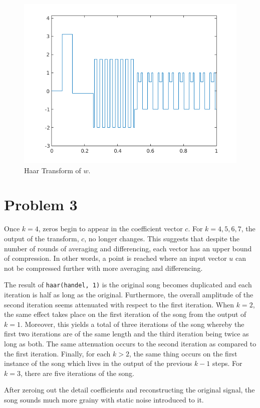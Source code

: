 \documentclass[paper=a4, fontsize=11pt]{scrartcl} %
\begin{document}
\begin{figure}[ht]
      \begin{minipage}[b]{0.5\linewidth}
          \centering
          \includegraphics[width=.5\linewidth]{haar_cat.png} 
          \caption{Haar Transform of $w$.} 
          \vspace{4ex}
      \end{minipage} 
  \end{figure}

\section*{Problem 3}

Once $k=4$, zeros begin to appear in the coefficient vector $c$.  For $k=4, 5,
6, 7$, the output of the transform, $c$, no longer changes. This suggests that
despite the number of rounds of averaging and differencing, each vector has an
upper bound of compression. In other words, a point is reached where an input
vector $u$ can not be compressed further with more averaging and differencing. 

\bigskip
The result of \texttt{haar(handel, 1)} is the original song becomes duplicated and
each iteration is half as long as the original.  Furthermore, the overall
amplitude of the second iteration seems attenuated with respect to the first
iteration. When $k=2$, the same effect takes place on the first iteration of
the song from the output of $k=1$. Moreover, this yields a total of three
iterations of the song whereby the first two iterations are of the same length
and the third iteration being twice as long as both. The same attenuation
occurs to the second iteration as compared to the first iteration.  Finally,
for each $k>2$, the same thing occurs on the first instance of the song which
lives in the output of the previous $k-1$ steps. For $k=3$, there are five
iterations of the song.

\bigskip
After zeroing out the detail coefficients and reconstructing the original
signal, the song sounds much more grainy with static noise introduced to it.
\end{document}
